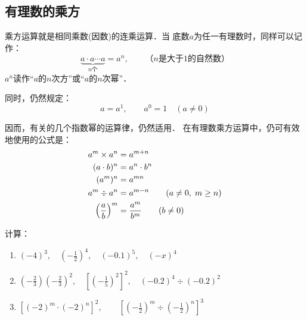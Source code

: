 \subsection{有理数的乘方}
乘方运算就是相同乘数(因数)的连乘运算．当
底数$a$为任一有理数时，同样可以记作：
\[\underbrace{a\cdot a\cdots a}_{n\text{个}} =a^n,\qquad \text{（$n$是大于1的自然数）}  \]
$a^n$读作“$a$的$n$次方”或“$a$的$n$次幂”．

同时，仍然规定：
\[a=a^1,\qquad a^0=1\quad (a\ne 0) \]

因而，有关的几个指数幂的运算律，仍然适用．
在有理数乘方运算中，仍可有效地使用的公式是：
\[\begin{split}
a^m\times a^n &=a^{m+n}\\
(a\cdot b)^n&=a^n\cdot b^n\\
(a^m)^n&=a^{mn}\\
a^m\div a^n&=a^{m-n}\qquad (a\ne 0,\; m\ge n)\\
\left(\dfrac{a}{b}\right)^m&=\dfrac{a^m}{b^m}\qquad (b\ne 0)
\end{split}\]



\begin{example}
	计算：
	\begin{enumerate}
		\item $(-4)^3,\quad \left(-\frac{1}{2}\right)^4,\quad (-0.1)^5,\quad (-x)^4$
		\item $\left(-\frac{2}{3}\right)\left(-\frac{2}{3}\right)^2,\quad \left[\left(-\frac{1}{5}\right)^2\right]^2,\quad (-0.2)^4\div (-0.2)^2$
		\item $\left[(-2)^m\cdot (-2)^n\right]^2,\qquad \left[\left(-\frac{1}{2}\right)^m\div \left(-\frac{1}{2}\right)^n\right]^3$
	\end{enumerate}
\end{example}

